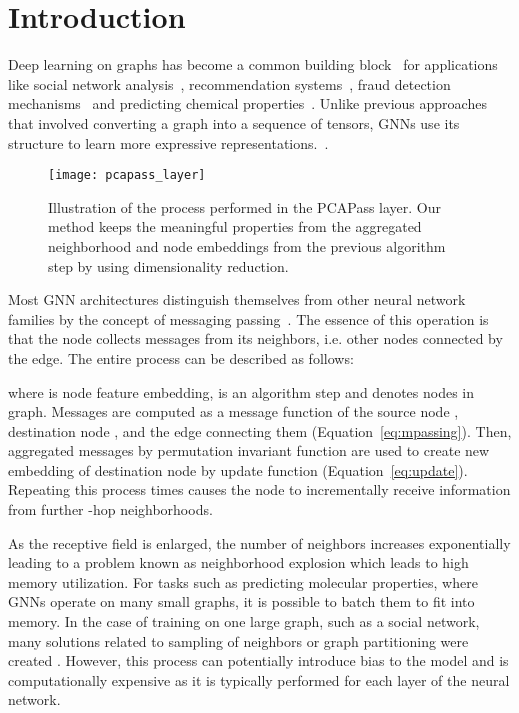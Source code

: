 \documentclass[nohyperref]{article}
\theoremstyle{plain}
\theoremstyle{definition}
\theoremstyle{remark}
\begin{document}
\section{Introduction}
Deep learning on graphs has become a common building block~\cite{zhang2020deep,gnnsurvey2021} for applications like social network analysis~\cite{li2021relevanceaware}, recommendation systems~\cite{gao2021graph}, fraud detection mechanisms~\cite{wang2021review} and predicting chemical properties~\cite{li2021graph}. 
Unlike previous approaches that involved converting a graph into a sequence of tensors, GNNs use its structure to learn more expressive representations.~\cite{hamilton2018representation,zhou2021graph}.
\begin{figure}[H]
    \vskip 0.2in
    \begin{center}
    \centerline{\texttt{[image: pcapass\_layer]}}
    \caption{Illustration of the process performed in the PCAPass layer. Our method keeps the meaningful properties from the aggregated neighborhood and node embeddings from the previous algorithm step by using dimensionality reduction.}
    \label{fig:pcapass_schema1}
    \end{center}
    \vskip -0.2in
\end{figure}
Most GNN architectures distinguish themselves from other neural network families by the concept of messaging passing~\cite{gilmer2017neural}. 
The essence of this operation is that the node collects messages from its neighbors, i.e. other nodes connected by the edge. 
The entire process can be described as follows:


where  is node feature embedding,  is an algorithm step and  denotes nodes in graph. 
Messages are computed as a message function  of the source node , destination node  , and the edge connecting them  (Equation~\ref{eq:mpassing}). 
Then, aggregated messages  by permutation invariant function are used to create new embedding of destination node by update function  (Equation~\ref{eq:update}). 
Repeating this process  times causes the node to incrementally receive information from further -hop neighborhoods.

As the receptive field is enlarged, the number of neighbors increases exponentially leading to a problem known as neighborhood explosion which leads to high memory utilization. 
For tasks such as predicting molecular properties, where GNNs operate on many small graphs, it is possible to batch them to fit into memory. 
In the case of training on one large graph, such as a social network, many solutions related to sampling of neighbors or graph partitioning were created \cite{pingsage2018,cluster2019,hamilton2018representation}. 
However, this process can potentially introduce bias to the model and is computationally expensive as it is typically performed for each layer of the neural network.
\end{document}
